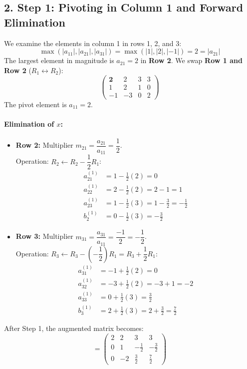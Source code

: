 \documentclass[11pt,a4paper]{article}
\newcommand{\abs}[1]{\left\lvert#1\right\rvert}
\begin{document}
\subsection*{2. Step 1: Pivoting in Column 1 and Forward Elimination}
We examine the elements in column 1 in rows 1, 2, and 3:
\[
\max\left( \abs{a_{11}}, \abs{a_{21}}, \abs{a_{31}} \right) = \max\left( \abs{1}, \abs{2}, \abs{-1} \right) = 2 = \abs{a_{21}}
\]
The largest element in magnitude is $a_{21} = 2$ in \textbf{Row 2}. We swap \textbf{Row 1 and Row 2} ($R_1 \leftrightarrow R_2$):
\begin{equation}
\left(\begin{array}{ccc|c}
\mathbf{2} & 2 & 3 & 3 \\
1 & 2 & 1 & 0 \\
-1 & -3 & 0 & 2
\end{array}\right)
\end{equation}
The pivot element is $a_{11} = 2$.

\paragraph{Elimination of $x$:}
\begin{itemize}[leftmargin=*]
    \item \textbf{Row 2:} Multiplier $m_{21} = \dfrac{a_{21}}{a_{11}} = \dfrac{1}{2}$.\\
    Operation: $R_2 \leftarrow R_2 - \dfrac{1}{2} R_1$:
    \begin{align*}
        a_{21}^{(1)} &= 1 - \frac{1}{2}(2) = 0 \\
        a_{22}^{(1)} &= 2 - \frac{1}{2}(2) = 2 - 1 = 1 \\
        a_{23}^{(1)} &= 1 - \frac{1}{2}(3) = 1 - \frac{3}{2} = -\frac{1}{2} \\
        b_2^{(1)} &= 0 - \frac{1}{2}(3) = -\frac{3}{2}
    \end{align*}

    \item \textbf{Row 3:} Multiplier $m_{31} = \dfrac{a_{31}}{a_{11}} = \dfrac{-1}{2} = -\dfrac{1}{2}$.\\
    Operation: $R_3 \leftarrow R_3 - \left(-\dfrac{1}{2}\right) R_1 = R_3 + \dfrac{1}{2} R_1$:
    \begin{align*}
        a_{31}^{(1)} &= -1 + \frac{1}{2}(2) = 0 \\
        a_{32}^{(1)} &= -3 + \frac{1}{2}(2) = -3 + 1 = -2 \\
        a_{33}^{(1)} &= 0 + \frac{1}{2}(3) = \frac{3}{2} \\
        b_3^{(1)} &= 2 + \frac{1}{2}(3) = 2 + \frac{3}{2} = \frac{7}{2}
    \end{align*}
\end{itemize}
After Step 1, the augmented matrix becomes:
\begin{equation}
[A^{(1)} \mid \mathbf{b}^{(1)}] = \left(\begin{array}{ccc|c}
2 & 2 & 3 & 3 \\
0 & 1 & -\frac{1}{2} & -\frac{3}{2} \\
0 & -2 & \frac{3}{2} & \frac{7}{2}
\end{array}\right)
\end{equation}
\end{document}
